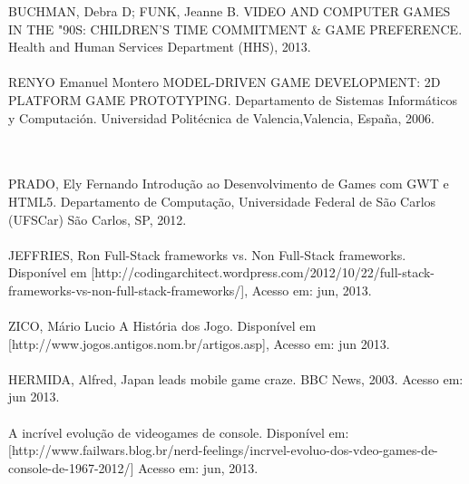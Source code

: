 \documentclass{article}
\begin{document}
BUCHMAN, Debra D; FUNK, Jeanne B. VIDEO AND COMPUTER GAMES IN THE "90S: CHILDREN'S TIME COMMITMENT & GAME PREFERENCE. Health and Human Services Department (HHS), 2013.
\\
\\
RENYO Emanuel Montero MODEL-DRIVEN GAME DEVELOPMENT: 2D PLATFORM GAME PROTOTYPING. Departamento de Sistemas Informáticos y Computación. Universidad Politécnica de Valencia,Valencia, España, 2006.

\\
\\
PRADO, Ely Fernando Introdução ao Desenvolvimento de Games com GWT e HTML5. Departamento de Computação, Universidade Federal de São Carlos (UFSCar) São Carlos, SP, 2012.
\\
\\
JEFFRIES, Ron Full-Stack frameworks vs. Non Full-Stack frameworks. Disponível em [http://codingarchitect.wordpress.com/2012/10/22/full-stack-frameworks-vs-non-full-stack-frameworks/], Acesso em: jun, 2013.
\\
\\
ZICO, Mário Lucio A História dos Jogo. Disponível em [http://www.jogos.antigos.nom.br/artigos.asp], Acesso em: jun 2013.
\\
\\
HERMIDA, Alfred, Japan leads mobile game craze. BBC News, 2003. Acesso em: jun 2013.
\\
\\
A incrível evolução de videogames de console. Disponível em: [http://www.failwars.blog.br/nerd-feelings/incrvel-evoluo-dos-vdeo-games-de-console-de-1967-2012/] Acesso em: jun, 2013.

\newpage

\printindex[not]

\printindex[list]

\printindex
\end{document}
